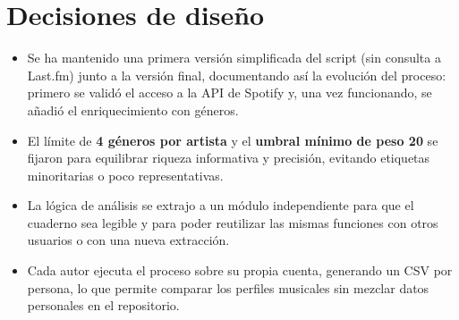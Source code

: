 \section{Decisiones de diseño}
\label{sec:decisiones}

\begin{itemize}
    \item Se ha mantenido una primera versión simplificada del script (sin consulta a Last.fm) junto a la versión final, documentando así la evolución del proceso: primero se validó el acceso a la API de Spotify y, una vez funcionando, se añadió el enriquecimiento con géneros.
    \item El límite de \textbf{4 géneros por artista} y el \textbf{umbral mínimo de peso 20} se fijaron para equilibrar riqueza informativa y precisión, evitando etiquetas minoritarias o poco representativas.
    \item La lógica de análisis se extrajo a un módulo independiente para que el cuaderno sea legible y para poder reutilizar las mismas funciones con otros usuarios o con una nueva extracción.
    \item Cada autor ejecuta el proceso sobre su propia cuenta, generando un CSV por persona, lo que permite comparar los perfiles musicales sin mezclar datos personales en el repositorio.
\end{itemize}
